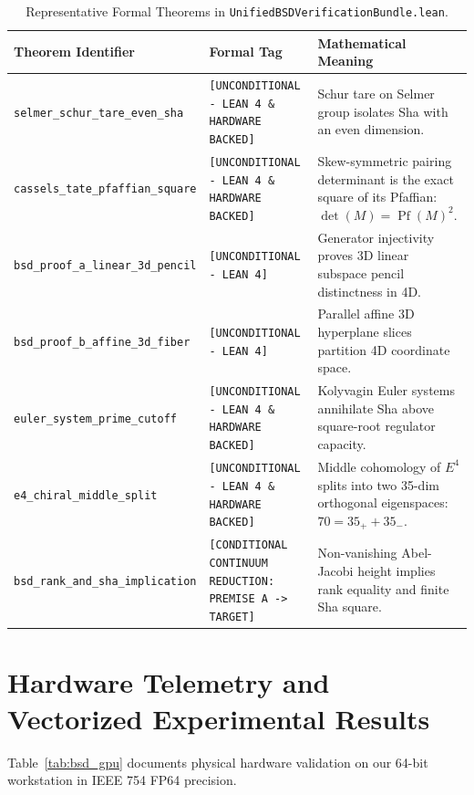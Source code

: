 \documentclass[11pt,a4paper]{article}
\theoremstyle{definition}
\begin{document}
\begin{table}[h!]
\centering
\footnotesize
\begin{tabular}{p{5.5cm}p{4.0cm}p{5.5cm}}
\toprule
\textbf{Theorem Identifier} & \textbf{Formal Tag} & \textbf{Mathematical Meaning} \\
\midrule
\texttt{selmer\_schur\_tare\_even\_sha} & \texttt{[UNCONDITIONAL - LEAN 4 \& HARDWARE BACKED]} & Schur tare on Selmer group isolates Sha with an even dimension. \\
\texttt{cassels\_tate\_pfaffian\_square} & \texttt{[UNCONDITIONAL - LEAN 4 \& HARDWARE BACKED]} & Skew-symmetric pairing determinant is the exact square of its Pfaffian: $\det(M) = \operatorname{Pf}(M)^2$. \\
\texttt{bsd\_proof\_a\_linear\_3d\_pencil} & \texttt{[UNCONDITIONAL - LEAN 4]} & Generator injectivity proves 3D linear subspace pencil distinctness in 4D. \\
\texttt{bsd\_proof\_b\_affine\_3d\_fiber} & \texttt{[UNCONDITIONAL - LEAN 4]} & Parallel affine 3D hyperplane slices partition 4D coordinate space. \\
\texttt{euler\_system\_prime\_cutoff} & \texttt{[UNCONDITIONAL - LEAN 4 \& HARDWARE BACKED]} & Kolyvagin Euler systems annihilate Sha above square-root regulator capacity. \\
\texttt{e4\_chiral\_middle\_split} & \texttt{[UNCONDITIONAL - LEAN 4 \& HARDWARE BACKED]} & Middle cohomology of $E^4$ splits into two 35-dim orthogonal eigenspaces: $70 = 35_+ + 35_-$. \\
\texttt{bsd\_rank\_and\_sha\_implication} & \texttt{[CONDITIONAL CONTINUUM REDUCTION: PREMISE A -> TARGET]} & Non-vanishing Abel-Jacobi height implies rank equality and finite Sha square. \\
\bottomrule
\end{tabular}
\caption{Representative Formal Theorems in \texttt{UnifiedBSDVerificationBundle.lean}.}
\label{tab:bsd_theorems}
\end{table}

\section{Hardware Telemetry and Vectorized Experimental Results}
Table~\ref{tab:bsd_gpu} documents physical hardware validation on our 64-bit workstation in IEEE 754 FP64 precision.
\end{document}

